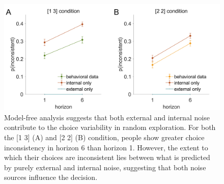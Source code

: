 \documentclass[12pt]{article}
\begin{document}
	\begin{figure}[h]
		\begin{center}
			\includegraphics[width=\textwidth]{figures/theory_da_info.png}
			\caption{Model-free analysis suggests that both external and internal noise contribute to the choice variability in random exploration. For both the [1 3] (A) and [2 2] (B) condition, people show greater choice inconsistency in horizon 6 than horizon 1. However, the extent to which their choices are inconsistent lies between what is predicted by purely external and internal noise, suggesting that both noise sources influence the decision.}
			\label{fig:mf2}
		\end{center}
	\end{figure}
	
\end{document}
